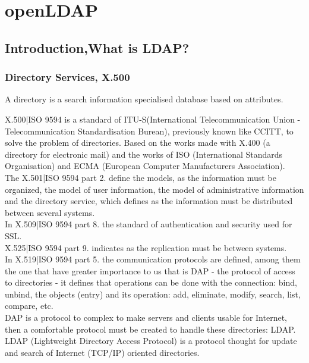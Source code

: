 \chapter{openLDAP}
\section{Introduction,What is LDAP?}
\subsection{Directory Services, X.500}

A directory is a search information specialised database based on attributes.

X.500|ISO 9594\cite{x500}  is a standard of ITU-S(International Telecommunication Union - Telecommunication Standardisation Burean),  previously known like CCITT, to solve the problem of directories. Based on the works made with X.400 (a directory for electronic mail) and the works of ISO (International Standards Organisation) and ECMA (European Computer Manufacturers Association).\\

The X.501|ISO 9594 part 2. define the models, as the information must be organized, the model of user information, the model of administrative information and the directory service, which defines as the information must be distributed between several systems.\\

In X.509|ISO 9594 part 8. the standard of authentication and security used for SSL.\\

X.525|ISO 9594 part 9.  indicates as the replication must be between systems.\\

In X.519|ISO 9594 part 5. the communication protocols are defined, among them the one that have greater importance to us that is DAP - the protocol of access to directories - it defines that operations can be done with the connection: bind, unbind, the objects (entry) and its operation: add, eliminate, modify, search, list, compare, etc.\\

DAP is a protocol to complex to make servers and clients usable for Internet, then a comfortable protocol must be created to handle these directories: LDAP.\\

LDAP (Lightweight Directory Access Protocol) is a protocol thought for update and search of Internet (TCP/IP) oriented directories. \\

